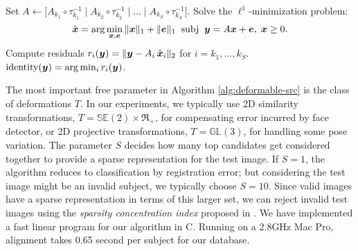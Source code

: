 \documentclass[10pt,twocolumn,letterpaper]{article}
\begin{document}
\begin{algorithm}[thb]
\begin{small}
\begin{algorithmic}[1]
\STATE Set $A \leftarrow \big[ A_{k_1} \circ \tau_{k_1}^{-1} \mid A_{k_2} \circ \tau_{k_2}^{-1} \mid \dots \mid A_{k_S} \circ \tau_{k_S}^{-1} \big]$. 
\STATE Solve the $\ell^1$-minimization problem: \vspace{-2mm}
$$\hat{\x} = \arg \min_{\x, \e} \| \x \|_1 + \|\e\|_1 \;\; \text{subj} \;\; \y = A \x + \e, \;\x \ge 0.\vspace{-2mm}$$
\STATE Compute residuals $r_i({\boldsymbol{y}}) = \| {{\boldsymbol{y}}} - {A}_i \, \hat{{\boldsymbol{x}}}_i \|_2$ for $i = k_1, \dots, k_S$.
 $\mbox{identity}({\boldsymbol{y}}) = \arg\min_i r_i({\boldsymbol{y}})$.
\end{algorithmic}
\end{small}
\end{algorithm}\vspace{-2mm}

The most important free parameter in Algorithm \ref{alg:deformable-src} is the class of deformations $T$. In our experiments, we typically use 2D similarity transformations, $T = \mathbb{SE}(2)\times \Re_+$, for compensating error incurred by face detector, or 2D projective transformations, $T = \mathbb{GL}(3)$, for handling some pose variation. The parameter $S$ decides how many top candidates get considered together to provide a sparse representation for the test image. If $S = 1$, the algorithm reduces to classification by registration error; but considering the test image might be an invalid subject, we typically choose $S = 10$. Since valid images have a sparse representation in terms of this larger set, we can reject invalid test images using the {\em sparsity concentration index} proposed in \cite{Wright2008-PAMI}. We have implemented a fast linear program for our algorithm in C. Running on a 2.8GHz Mac Pro, alignment takes 0.65 second per subject for our database. \vspace{-3mm}
\end{document}
